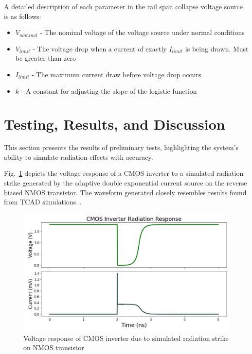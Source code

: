 \documentclass[conference]{IEEEtran}
\begin{document}
    A detailed description of each parameter in the rail span collapse voltage source is as follows:

    \begin{itemize}

        \item[] \(V_{nominal}\) - The nominal voltage of the voltage source under normal conditions

        \item[] \(V_{limit}\) - The voltage drop when a current of exactly \(I_{limit}\) is being drawn.
        Must be greater than zero

        \item[] \(I_{limit}\) - The maximum current draw before voltage drop occurs

        \item[] \(k\) - A constant for adjusting the slope of the logistic function

    \end{itemize}


    \section{Testing, Results, and Discussion}\label{sec:testing-results-and-discussion}
    This section presents the results of preliminary tests, highlighting the system's ability to simulate radiation effects with accuracy.

    Fig.~\ref{fig:inverter_response} depicts the voltage response of a CMOS inverter to a simulated radiation strike generated by the adaptive double exponential current source on the reverse biased NMOS transistor.
    The waveform generated closely resembles results found from TCAD simulations~\cite{Kauppila2009}.

    \begin{figure}[htbp]
        \centering
        \includegraphics[width=0.95\linewidth]{Inverter_Response}
        \caption{Voltage response of CMOS inverter due to simulated radiation strike on NMOS transistor}
        \label{fig:inverter_response}
    \end{figure}
\end{document}
